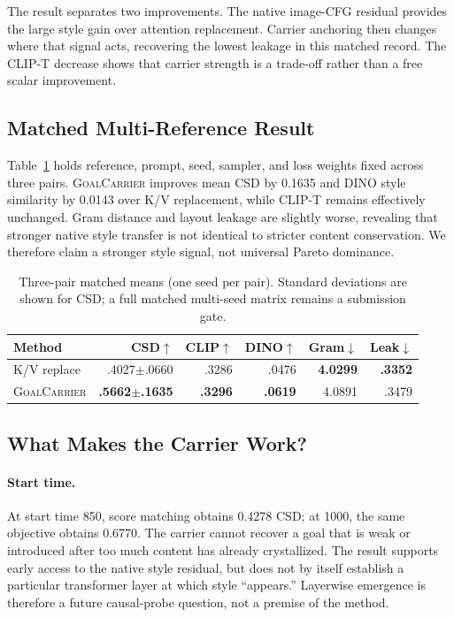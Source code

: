 \documentclass[10pt,letterpaper]{article}
\newcommand{\method}{\textsc{GoalCarrier}}
\begin{document}
The result separates two improvements. The native image-CFG residual provides
the large style gain over attention replacement. Carrier anchoring then changes
where that signal acts, recovering the lowest leakage in this matched record.
The CLIP-T decrease shows that carrier strength is a trade-off rather than a
free scalar improvement.

\subsection{Matched Multi-Reference Result}

Table~\ref{tab:threepair} holds reference, prompt, seed, sampler, and loss
weights fixed across three pairs. \method{} improves mean CSD by 0.1635 and DINO
style similarity by 0.0143 over K/V replacement, while CLIP-T remains
effectively unchanged. Gram distance and layout leakage are slightly worse,
revealing that stronger native style transfer is not identical to stricter
content conservation. We therefore claim a stronger style signal, not universal
Pareto dominance.

\begin{table}[t]
\centering
\caption{Three-pair matched means (one seed per pair). Standard deviations are
shown for CSD; a full matched multi-seed matrix remains a submission gate.}
\label{tab:threepair}
\small
\setlength{\tabcolsep}{3.4pt}
\begin{tabular}{lrrrrr}
\toprule
Method & CSD$\uparrow$ & CLIP$\uparrow$ & DINO$\uparrow$ & Gram$\downarrow$ & Leak$\downarrow$\\
\midrule
K/V replace & .4027$\pm$.0660 & .3286 & .0476 & \textbf{4.0299} & \textbf{.3352}\\
\method & \textbf{.5662$\pm$.1635} & \textbf{.3296} & \textbf{.0619} & 4.0891 & .3479\\
\bottomrule
\end{tabular}
\end{table}

\subsection{What Makes the Carrier Work?}

\paragraph{Start time.}
At start time 850, score matching obtains 0.4278 CSD; at 1000, the same
objective obtains 0.6770. The carrier cannot recover a goal that is weak or
introduced after too much content has already crystallized. The result supports
early access to the native style residual, but does not by itself establish a
particular transformer layer at which style ``appears.'' Layerwise emergence is
therefore a future causal-probe question, not a premise of the method.
\end{document}
